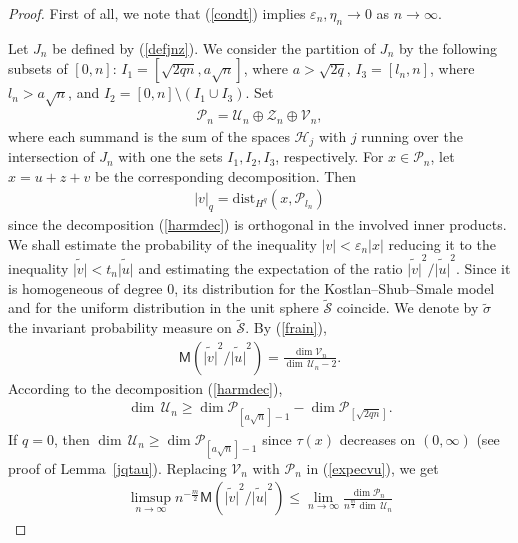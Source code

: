 \documentclass[10pt]{amsart}
\theoremstyle{remark}
\let\td=\tilde
\let\wtd=\widetilde
\begin{document}
\begin{proof}
First of all, we note that (\ref{condt}) implies
${{\mathord{\varepsilon}}}_n,\eta_n\to0$ as $n\to\infty$.

Let $J_n$ be defined by (\ref{defjnz}). We consider the partition
of $J_n$ by the following subsets of $[0,n]$:
$I_1=[\sqrt{2qn},a\sqrt{n}]$, where $a>\sqrt{2q}$, $I_3=[l_n,n]$,
where $l_n>a\sqrt{n}$, and $I_2=[0,n]\setminus(I_1\mathop\cup
I_3)$.
Set
\begin{eqnarray}\label{decuzv}
{\mathcal{P}}_n={\mathcal{U}}_n\oplus{\mathcal{Z}}_n\oplus{\mathcal{V}}_n,
\end{eqnarray}
where each summand is the sum of the spaces ${\mathcal{H}}_j$ with $j$
running over the intersection of $J_n$ with one the sets
$I_1,I_2,I_3$, respectively. For $x\in{\mathcal{P}}_n$, let $x=u+z+v$ be the
corresponding decomposition. Then
\begin{eqnarray*}
|v|_q={\mathrm{dist}}_{H^q}(x,{\mathcal{P}}_{l_n})
\end{eqnarray*}
since the decomposition (\ref{harmdec}) is orthogonal in the
involved inner products. We shall estimate the probability of the
inequality $|v|<{{\mathord{\varepsilon}}}_n|x|$ reducing it to the inequality
$\wtd{|v|}< t_n\wtd{|u|}$ and estimating the expectation of the
ratio $\wtd{|v|}^2/\wtd{|u|}^2$. Since it is homogeneous of degree
$0$, its distribution for the Kostlan--Shub--Smale model and for
the uniform distribution in the unit sphere $\td{\mathcal{S}}$ coincide. We
denote by $\td{{\mathord{\sigma}}}$ the invariant probability measure on $\td{\mathcal{S}}$.
By (\ref{frain}),
\begin{eqnarray}\label{expecvu}
{{\mathsf{M}}}\left(\wtd{|v|}^2/{\wtd{|u|}^{2}}\right)
=\frac{\dim{\mathcal{V}}_n}{\dim\,{\mathcal{U}}_n-2}.
\end{eqnarray}
According to the decomposition (\ref{harmdec}),
\begin{eqnarray*}
\dim\,{\mathcal{U}}_n\geq\dim{\mathcal{P}}_{[a\sqrt{n}]-1}-\dim{\mathcal{P}}_{[\sqrt{2qn}]}.
\end{eqnarray*}
If $q=0$, then $\dim\,{\mathcal{U}}_n\geq\dim{\mathcal{P}}_{[a\sqrt{n}]-1}$ since
$\tau(x)$ decreases on $(0,\infty)$ (see proof of
Lemma~\ref{jqtau}). Replacing ${\mathcal{V}}_n$ with ${\mathcal{P}}_n$ in
(\ref{expecvu}), we get
\begin{eqnarray*}
\limsup_{n\to\infty}n^{-\frac{m}{2}}
{{\mathsf{M}}}\left({\wtd{|v|}^2}/{\wtd{|u|}^{2}}\right)\leq
\lim_{n\to\infty}\frac{\dim{\mathcal{P}}_n}{n^{\frac{m}{2}}\dim\,{\mathcal{U}}_n}

\end{eqnarray*}
\end{proof}
\end{document}
